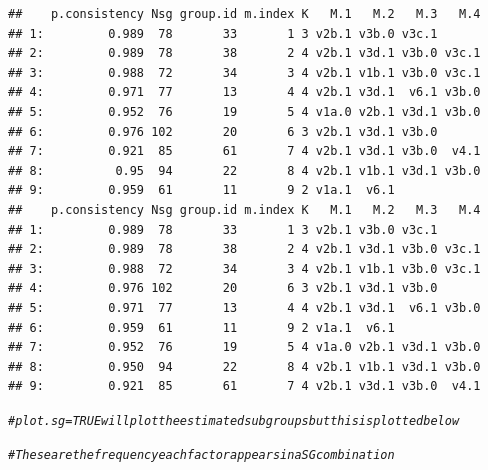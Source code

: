 \documentclass[9pt]{article}\usepackage[]{graphicx}\usepackage[]{xcolor}
\makeatletter
\newcommand{\hlcom}[1]{\textcolor[rgb]{0.678,0.584,0.686}{\textit{#1}}}%
\newenvironment{kframe}{%
 \def\at@end@of@kframe{}%
 \ifinner\ifhmode%
  \def\at@end@of@kframe{\end{minipage}}%
  \begin{minipage}{\columnwidth}%
 \fi\fi%
 \def\FrameCommand##1{\hskip\@totalleftmargin \hskip-\fboxsep
 \colorbox{shadecolor}{##1}\hskip-\fboxsep
     \hskip-\linewidth \hskip-\@totalleftmargin \hskip\columnwidth}%
 \MakeFramed {\advance\hsize-\width
   \@totalleftmargin\z@ \linewidth\hsize
   \@setminipage}}%
 {\par\unskip\endMakeFramed%
 \at@end@of@kframe}
\newenvironment{knitrout}{}{} %
\theoremstyle{definition}
\theoremstyle{remark}
\makeatother
\begin{document}
\begin{knitrout}
\begin{kframe}
\begin{verbatim}
##    p.consistency Nsg group.id m.index K   M.1   M.2   M.3   M.4
## 1:         0.989  78       33       1 3 v2b.1 v3b.0 v3c.1      
## 2:         0.989  78       38       2 4 v2b.1 v3d.1 v3b.0 v3c.1
## 3:         0.988  72       34       3 4 v2b.1 v1b.1 v3b.0 v3c.1
## 4:         0.971  77       13       4 4 v2b.1 v3d.1  v6.1 v3b.0
## 5:         0.952  76       19       5 4 v1a.0 v2b.1 v3d.1 v3b.0
## 6:         0.976 102       20       6 3 v2b.1 v3d.1 v3b.0      
## 7:         0.921  85       61       7 4 v2b.1 v3d.1 v3b.0  v4.1
## 8:          0.95  94       22       8 4 v2b.1 v1b.1 v3d.1 v3b.0
## 9:         0.959  61       11       9 2 v1a.1  v6.1            
##    p.consistency Nsg group.id m.index K   M.1   M.2   M.3   M.4
## 1:         0.989  78       33       1 3 v2b.1 v3b.0 v3c.1      
## 2:         0.989  78       38       2 4 v2b.1 v3d.1 v3b.0 v3c.1
## 3:         0.988  72       34       3 4 v2b.1 v1b.1 v3b.0 v3c.1
## 4:         0.976 102       20       6 3 v2b.1 v3d.1 v3b.0      
## 5:         0.971  77       13       4 4 v2b.1 v3d.1  v6.1 v3b.0
## 6:         0.959  61       11       9 2 v1a.1  v6.1            
## 7:         0.952  76       19       5 4 v1a.0 v2b.1 v3d.1 v3b.0
## 8:         0.950  94       22       8 4 v2b.1 v1b.1 v3d.1 v3b.0
## 9:         0.921  85       61       7 4 v2b.1 v3d.1 v3b.0  v4.1
\end{verbatim}
\begin{alltt}
\hlcom{# plot.sg=TRUE will plot the estimated subgroups but this is plotted below}

\hlcom{# These are the frequency each factor appears in a SG combination}


\end{alltt}
\end{kframe}
\end{knitrout}
\end{document}
